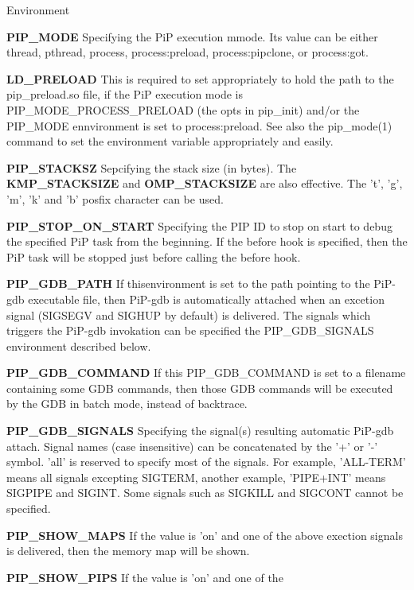 \begin{DoxyParagraph}{Environment}
\begin{DoxyItemize}
\item {\bfseries P\-I\-P\-\_\-\-M\-O\-D\-E} Specifying the Pi\-P execution mmode. Its value can be either {\ttfamily thread}, {\ttfamily pthread}, {\ttfamily process}, {\ttfamily process\-:preload}, {\ttfamily process\-:pipclone}, or {\ttfamily process\-:got}. \item {\bfseries L\-D\-\_\-\-P\-R\-E\-L\-O\-A\-D} This is required to set appropriately to hold the path to the {\ttfamily pip\-\_\-preload.\-so} file, if the Pi\-P execution mode is {\ttfamily P\-I\-P\-\_\-\-M\-O\-D\-E\-\_\-\-P\-R\-O\-C\-E\-S\-S\-\_\-\-P\-R\-E\-L\-O\-A\-D} (the {\ttfamily opts} in {\ttfamily pip\-\_\-init}) and/or the P\-I\-P\-\_\-\-M\-O\-D\-E ennvironment is set to {\ttfamily process\-:preload}. See also the pip\-\_\-mode(1) command to set the environment variable appropriately and easily. \item {\bfseries P\-I\-P\-\_\-\-S\-T\-A\-C\-K\-S\-Z} Sepcifying the stack size (in bytes). The {\bfseries K\-M\-P\-\_\-\-S\-T\-A\-C\-K\-S\-I\-Z\-E} and {\bfseries O\-M\-P\-\_\-\-S\-T\-A\-C\-K\-S\-I\-Z\-E} are also effective. The 't', 'g', 'm', 'k' and 'b' posfix character can be used. \item {\bfseries P\-I\-P\-\_\-\-S\-T\-O\-P\-\_\-\-O\-N\-\_\-\-S\-T\-A\-R\-T} Specifying the P\-I\-P I\-D to stop on start to debug the specified Pi\-P task from the beginning. If the before hook is specified, then the Pi\-P task will be stopped just before calling the before hook. \item {\bfseries P\-I\-P\-\_\-\-G\-D\-B\-\_\-\-P\-A\-T\-H} If thisenvironment is set to the path pointing to the Pi\-P-\/gdb executable file, then Pi\-P-\/gdb is automatically attached when an excetion signal (S\-I\-G\-S\-E\-G\-V and S\-I\-G\-H\-U\-P by default) is delivered. The signals which triggers the Pi\-P-\/gdb invokation can be specified the {\ttfamily P\-I\-P\-\_\-\-G\-D\-B\-\_\-\-S\-I\-G\-N\-A\-L\-S} environment described below. \item {\bfseries P\-I\-P\-\_\-\-G\-D\-B\-\_\-\-C\-O\-M\-M\-A\-N\-D} If this P\-I\-P\-\_\-\-G\-D\-B\-\_\-\-C\-O\-M\-M\-A\-N\-D is set to a filename containing some G\-D\-B commands, then those G\-D\-B commands will be executed by the G\-D\-B in batch mode, instead of backtrace. \item {\bfseries P\-I\-P\-\_\-\-G\-D\-B\-\_\-\-S\-I\-G\-N\-A\-L\-S} Specifying the signal(s) resulting automatic Pi\-P-\/gdb attach. Signal names (case insensitive) can be concatenated by the '+' or '-\/' symbol. 'all' is reserved to specify most of the signals. For example, 'A\-L\-L-\/\-T\-E\-R\-M' means all signals excepting {\ttfamily S\-I\-G\-T\-E\-R\-M}, another example, 'P\-I\-P\-E+\-I\-N\-T' means {\ttfamily S\-I\-G\-P\-I\-P\-E} and {\ttfamily S\-I\-G\-I\-N\-T}. Some signals such as S\-I\-G\-K\-I\-L\-L and S\-I\-G\-C\-O\-N\-T cannot be specified. \item {\bfseries P\-I\-P\-\_\-\-S\-H\-O\-W\-\_\-\-M\-A\-P\-S} If the value is 'on' and one of the above exection signals is delivered, then the memory map will be shown. \item {\bfseries P\-I\-P\-\_\-\-S\-H\-O\-W\-\_\-\-P\-I\-P\-S} If the value is 'on' and one of the 
\end{DoxyItemize}
\end{DoxyParagraph}
